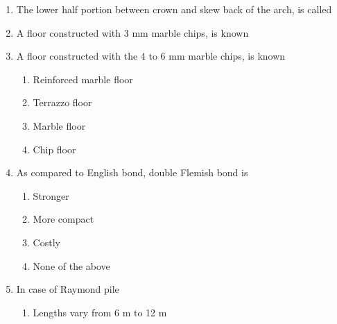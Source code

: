 \documentclass[11pt,a4paper]{article}
\begin{document}
\begin{enumerate}
\\
\item{The lower half portion between crown and skew back of the arch, is called}
\\
\item{A floor constructed with 3 mm marble chips, is known}
\\
\item{A floor constructed with the 4 to 6 mm marble chips, is known}
\begin{enumerate}[label=\Alph*.]
\item{Reinforced marble floor}
\item{Terrazzo floor}
\item{Marble floor}
\item{Chip floor}
\end{enumerate}
\item{As compared to English bond, double Flemish bond is}
\begin{enumerate}[label=\Alph*.]
\item{Stronger}
\item{More compact}
\item{Costly}
\item{None of the above}
\end{enumerate}
\item{In case of Raymond pile}
\begin{enumerate}[label=\Alph*.]
\item{Lengths vary from 6 m to 12 m}

\end{enumerate}
\end{enumerate}
\end{document}
